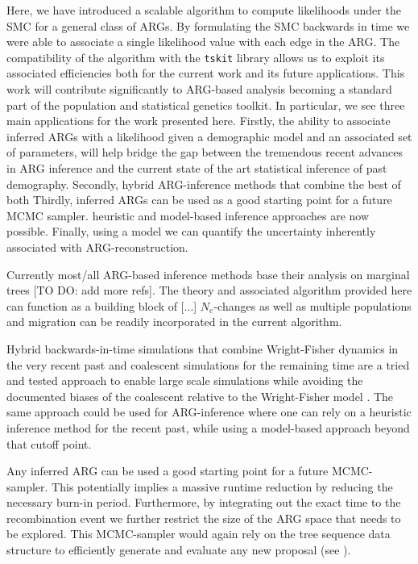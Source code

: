 \documentclass{article}
\begin{document}
Here, we have introduced a scalable algorithm to compute likelihoods
under the SMC for a general class of ARGs. By formulating the SMC backwards in time
we were able to associate a single likelihood value with each edge in the ARG.
The compatibility of the algorithm with the \texttt{tskit} library allows us to
exploit its associated efficiencies both for the current work and its future
applications. This work will contribute significantly
to ARG-based analysis becoming a standard part of the population
and statistical genetics toolkit.
In particular, we see three main applications for the work presented here.
Firstly, the ability to associate inferred ARGs with a likelihood given a demographic
model and an associated set of parameters, will help bridge the gap between the tremendous recent
advances in ARG inference and the current state of the art statistical inference of
past demography.
Secondly, hybrid ARG-inference methods that combine the best of both
Thirdly, inferred ARGs can be used as a good starting point for a future MCMC sampler.
heuristic and model-based inference approaches are now possible.
Finally, using a model we can quantify the uncertainty inherently associated
with ARG-reconstruction.

Currently most/all ARG-based inference methods base their analysis on marginal
trees \citep{hejase_2022} [TO DO: add more refs]. The theory and associated algorithm
provided here can function as a building block of [...]
$N_e$-changes as well as multiple populations and migration can be readily incorporated
in the current algorithm.


Hybrid backwards-in-time simulations that combine Wright-Fisher dynamics in the
very recent past and coalescent simulations for the remaining time are a tried and tested
approach \citep{bhaskar_distortion_2014, nelson_accounting_2020} to enable large scale
simulations while avoiding the documented biases of the coalescent relative to the
Wright-Fisher model \citep{bhaskar_distortion_2014, wakeley_gene_2012}. The same approach
could be used for ARG-inference where one can rely on a heuristic inference method for
the recent past, while using a model-based approach beyond that cutoff point.

Any inferred ARG can be used a good starting point
for a future MCMC-sampler. This potentially implies a massive runtime reduction by
reducing the necessary burn-in period. Furthermore, by integrating out the exact time
to the recombination event we further restrict the size of the ARG space that needs to
be explored. This MCMC-sampler would again rely on the tree sequence data structure to
efficiently generate and evaluate any new proposal (see \citep{mahmoudi_bayesian_2022}).
\end{document}
